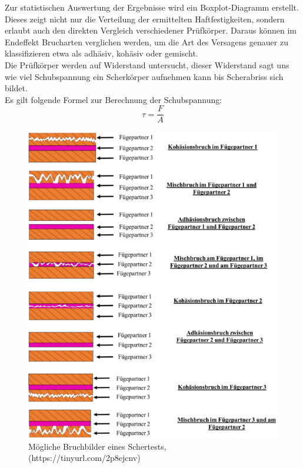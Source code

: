 Zur statistischen Auswertung der Ergebnisse wird ein Boxplot-Diagramm erstellt. Dieses zeigt nicht nur die Verteilung der ermittelten Haftfestigkeiten, sondern erlaubt auch den direkten Vergleich verschiedener Prüfkörper. Daraus können im Endeffekt Brucharten verglichen werden, um die Art des Versagens genauer zu klassifizieren etwa als adhäsiv, kohäsiv oder gemischt.\\
Die Prüfkörper werden auf Widerstand untersucht, dieser Widerstand sagt uns wie viel Schubspannung ein Scherkörper aufnehmen kann bis Scherabriss sich bildet.\\
Es gilt folgende Formel zur Berechnung der Schubspannung:\\
\begin{equation}
    \tau = \frac{F}{A}
\end{equation}   
\vspace{0.2cm}
\begin{figure}
    \centering
    \includegraphics[scale=0.85]{Bilder/Brucharten.png}
    \caption{Mögliche Bruchbilder eines Schertests, (https://tinyurl.com/2p8ejcnv)}
    \vspace{0.2cm}
    \label{Abb.3: Mögliche Bruchbilder eines Schertests}
\end{figure}
\\
